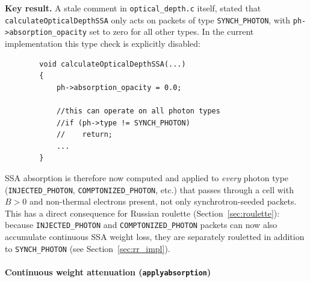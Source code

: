 \documentclass[12pt,a4paper]{article}
\newcommand{\code}[1]{\texttt{#1}}
\newenvironment{keyresult}{%
	\begin{framed}\noindent\textbf{Key result.}\quad}
	{\end{framed}}
\begin{document}
\begin{keyresult}
	A stale comment in
	\code{optical\_depth.c} itself, stated that
	\code{calculateOpticalDepthSSA} only acts on packets of type
	\code{SYNCH\_PHOTON}, with \code{ph->absorption\_opacity} set to zero
	for all other types. In the current implementation this type check is
	explicitly disabled:
	\begin{verbatim}
		void calculateOpticalDepthSSA(...)
		{
			ph->absorption_opacity = 0.0;
			
			//this can operate on all photon types
			//if (ph->type != SYNCH_PHOTON)
			//    return;
			...
		}
	\end{verbatim}
	SSA absorption is therefore now computed and applied to \emph{every}
	photon type (\code{INJECTED\_PHOTON}, \code{COMPTONIZED\_PHOTON}, etc.)
	that passes through a cell with $B>0$ and non-thermal electrons present,
	not only synchrotron-seeded packets. This has a direct consequence for
	Russian roulette (Section~\ref{sec:roulette}): because
	\code{INJECTED\_PHOTON} and \code{COMPTONIZED\_PHOTON} packets can now
	also accumulate continuous SSA weight loss, they are separately
	rouletted in addition to \code{SYNCH\_PHOTON} (see
	Section~\ref{sec:rr_impl}).
\end{keyresult}

\paragraph{Continuous weight attenuation (\texttt{applyabsorption})}
\label{sec:applyabs}
\end{document}
